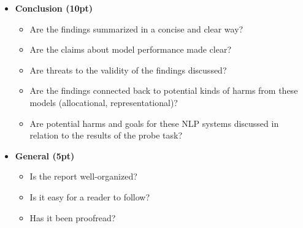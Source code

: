 \documentclass[12pt,table]{article}
\begin{document}
\begin{itemize}
\item \textbf{Conclusion (10pt)}
\begin{itemize}
\item Are the findings summarized in a concise and clear way?
\item Are the claims about model performance made clear?
\item Are threats to the validity of the findings discussed?
\item Are the findings connected back to potential kinds of harms from these models (allocational, representational)?
\item Are potential harms and goals for these NLP systems discussed in relation to the results of the probe task?
\end{itemize}

\item \textbf{General (5pt)}
\begin{itemize}
\item Is the report well-organized?
\item Is it easy for a reader to follow?
\item Has it been proofread?
\end{itemize}
\end{itemize}
\end{document}
